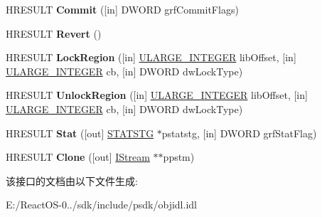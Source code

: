 \begin{DoxyCompactItemize}
\item 
\mbox{\label{interface_i_stream_a5646f0707ddda796a3c61d7e107da999}} 
H\+R\+E\+S\+U\+LT {\bfseries Commit} (\mbox{[}in\mbox{]} D\+W\+O\+RD grf\+Commit\+Flags)
\item 
\mbox{\label{interface_i_stream_aa62ea59d76e1836bf7096f52cb9329e8}} 
H\+R\+E\+S\+U\+LT {\bfseries Revert} ()
\item 
\mbox{\label{interface_i_stream_af7c473f4f4149aa955bd24a2596f169b}} 
H\+R\+E\+S\+U\+LT {\bfseries Lock\+Region} (\mbox{[}in\mbox{]} \hyperlink{struct___u_l_a_r_g_e___i_n_t_e_g_e_r}{U\+L\+A\+R\+G\+E\+\_\+\+I\+N\+T\+E\+G\+ER} lib\+Offset, \mbox{[}in\mbox{]} \hyperlink{struct___u_l_a_r_g_e___i_n_t_e_g_e_r}{U\+L\+A\+R\+G\+E\+\_\+\+I\+N\+T\+E\+G\+ER} cb, \mbox{[}in\mbox{]} D\+W\+O\+RD dw\+Lock\+Type)
\item 
\mbox{\label{interface_i_stream_aa315c049f196c4480e63c8640ddecca5}} 
H\+R\+E\+S\+U\+LT {\bfseries Unlock\+Region} (\mbox{[}in\mbox{]} \hyperlink{struct___u_l_a_r_g_e___i_n_t_e_g_e_r}{U\+L\+A\+R\+G\+E\+\_\+\+I\+N\+T\+E\+G\+ER} lib\+Offset, \mbox{[}in\mbox{]} \hyperlink{struct___u_l_a_r_g_e___i_n_t_e_g_e_r}{U\+L\+A\+R\+G\+E\+\_\+\+I\+N\+T\+E\+G\+ER} cb, \mbox{[}in\mbox{]} D\+W\+O\+RD dw\+Lock\+Type)
\item 
\mbox{\label{interface_i_stream_a912ca5d18d263cee0fee57313c9911c1}} 
H\+R\+E\+S\+U\+LT {\bfseries Stat} (\mbox{[}out\mbox{]} \hyperlink{struct_i_stream_1_1tag_s_t_a_t_s_t_g}{S\+T\+A\+T\+S\+TG} $\ast$pstatstg, \mbox{[}in\mbox{]} D\+W\+O\+RD grf\+Stat\+Flag)
\item 
\mbox{\label{interface_i_stream_ab108d3280c83114fd90f892cf31f81dd}} 
H\+R\+E\+S\+U\+LT {\bfseries Clone} (\mbox{[}out\mbox{]} \hyperlink{interface_i_stream}{I\+Stream} $\ast$$\ast$ppstm)
\end{DoxyCompactItemize}


该接口的文档由以下文件生成\+:\begin{DoxyCompactItemize}
\item 
E\+:/\+React\+O\+S-\/0../sdk/include/psdk/objidl.\+idl\end{DoxyCompactItemize}
